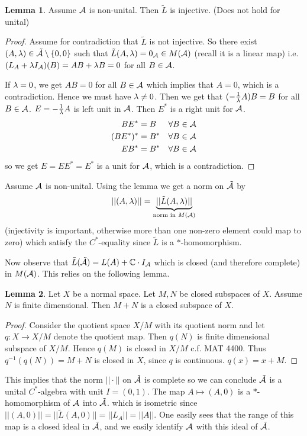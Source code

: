\documentclass[10pt,english,a4paper]{article}
\theoremstyle{definition}
\newtheorem*{lemma}{Lemma}
\begin{document}
\begin{lemma}
    Assume $\mathcal{A}$ is non-unital. Then $\tilde{L}$ is injective. (Does not hold for unital) 
\end{lemma}
\begin{proof}
    Assume for contradiction that $\tilde{L}$ is not injective. So there exist 
$(A,\lambda) \in \tilde{\mathcal{A}}\setminus \{0,0\}$ such that $\tilde{L}(A,\lambda) = 0_{\mathcal{A}} \in M(\mathcal{A})$ (recall it is a linear map)
i.e. $(L_A + \lambda I_{\mathcal{A}})(B) = AB + \lambda B = 0$ for all $B \in \mathcal{A}$.

If $\lambda = 0$, we get $AB = 0$ for all $B \in \mathcal{A}$ which implies that $A =0$,
which is a contradiction. Hence we must have $\lambda \neq 0$. 
Then we get that $(-\tfrac{1}{\lambda}A)B = B$ for all $B \in \mathcal{A}$. $E = -\tfrac{1}{\lambda}A$
is left unit in $\mathcal{A}$. Then $E^*$ is a right unit for $\mathcal{A}$.
\begin{align*}
    BE^* &= B  &&\forall B \in \mathcal{A} \\
    (BE^*)^* &= B^*  &&\forall B \in \mathcal{A} \\
    EB^* &= B^*  &&\forall B \in \mathcal{A}
\end{align*}
so we get $E = EE^* = E^*$ is a unit for $\mathcal{A}$, which is a contradiction. 
\end{proof}

Assume $\mathcal{A}$ is non-unital. Using the lemma we get a norm on $\tilde{\mathcal{A}}$ by
\[
||(A,\lambda)|| = \underbrace{||\tilde{L}(A,\lambda)||}_{\text{norm in }M(\mathcal{A})}
\]
(injectivity is important, otherwise more than one non-zero element could map to zero)
which satisfy the $C^*$-equality since $\tilde{L}$ is a $*$-homomorphism.

Now observe that $\tilde{L}(\tilde{\mathcal{A}}) = L(A) + \mathbb{C} \cdot I_{\mathcal{A}}$ which is closed 
(and therefore complete) in $M(\mathcal{A})$. This relies on the following lemma.

\begin{lemma}
    Let $X$ be a normal space. Let $M,N$ be closed subspaces of $X$. Assume $N$ is finite 
    dimensional. Then $M+N$ is a closed subspace of $X$.
\end{lemma}
\begin{proof}
    Consider the quotient space $X/M$ with its quotient norm and let $q\colon X
    \to X/M$ denote the quotient map. Then $q(N)$ is finite dimensional subspace of
    $X/M$. Hence $q(M)$ is closed in $X/M$ c.f. MAT 4400. Thus $q^{-1} (q(N)) = M+N$
     is closed in $X$, since $q$ is continuous.  $q(x) = x+M$. 
\end{proof}
This implies that the norm $||\cdot||$ on $\tilde{\mathcal{A}}$ is complete so we can 
conclude $\tilde{\mathcal{A}}$ is a unital $C^*$-algebra with unit $I=(0,1)$.
The map $A \mapsto (A,0)$ is a $*$-homomorphism of $\mathcal{A}$ into $\tilde{\mathcal{A}}$.
which is isometric since $||(A,0)|| = ||\tilde{L}(A,0)|| = ||L_A||=||A||$.
One easily sees that the range of this map is a closed ideal in $\tilde{\mathcal{A}}$,
and we easily identify $\mathcal{A}$ with this ideal of $\tilde{\mathcal{A}}$. 
\end{document}
